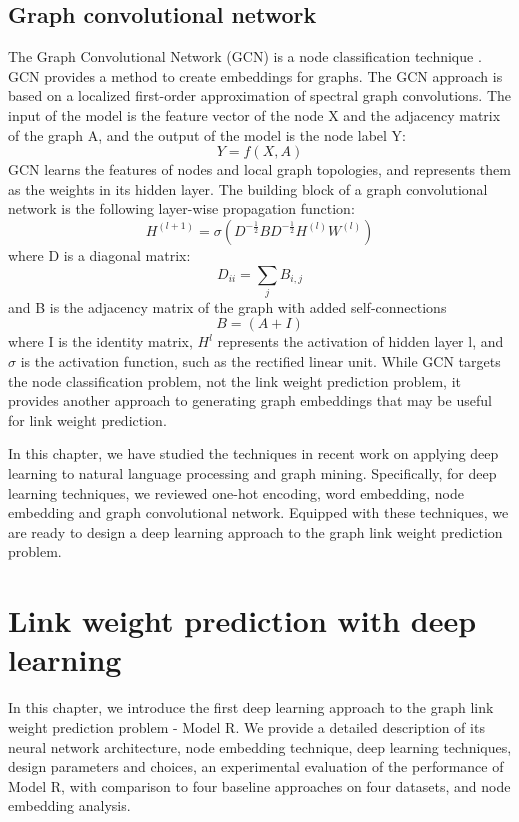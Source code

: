 \documentclass[12pt]{WSUThesis}
\theoremstyle{definition}
\begin{document}
\section{Graph convolutional network}
The Graph Convolutional Network (GCN) is a node classification technique \cite{kipf2016semi}.
GCN provides a method to create embeddings for graphs.
The GCN approach is based on a localized first-order approximation of spectral graph convolutions.
The input of the model is the feature vector of the node X and the adjacency matrix of the graph A, and the output of the model is the node label Y:
\[Y = f(X, A)\]
GCN learns the features of nodes and local graph topologies, and represents them as the weights in its hidden layer.
The building block of a graph convolutional network is the following layer-wise propagation function:
\[H^{(l+1)} = \sigma(D^{-\frac{1}{2}} B D^{-\frac{1}{2}} H^{(l)} W^{(l)})\]
where D is a diagonal matrix:
\[D_{ii} = \sum_jB_{i,j}\]
and B is the adjacency matrix of the graph with added self-connections
\[B = (A + I)\]
where I is the identity matrix,
$ H^l $ represents the activation of hidden layer l,
and $ \sigma $ is the activation function, such as the rectified linear unit. While GCN targets the node classification problem, not the link weight prediction problem, it provides another approach to generating graph embeddings that may be useful for link weight prediction.

In this chapter, we have studied the techniques in recent work on applying deep learning to natural language processing and graph mining.
Specifically, for deep learning techniques, we reviewed one-hot encoding, word embedding, node embedding and graph convolutional network.
Equipped with these techniques, we are ready to design a deep learning approach to the graph link weight prediction problem.

\chapter{Link weight prediction with deep learning}
In this chapter, we introduce the first deep learning approach to the graph link weight prediction problem - Model R.
We provide a detailed description of its neural network architecture, node embedding technique, deep learning techniques, design parameters and choices, an experimental evaluation of the performance of Model R, with comparison to four baseline approaches on four datasets, and node embedding analysis.
\end{document}

